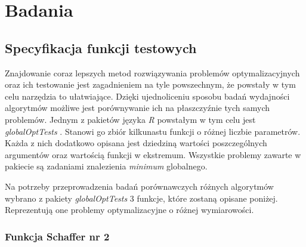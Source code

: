\newpage
\chapter{Badania}


\section{Specyfikacja funkcji testowych}
Znajdowanie coraz lepszych metod rozwiązywania problemów optymalizacyjnych oraz ich testowanie jest zagadnieniem na tyle powszechnym, że powstały w tym celu narzędzia to ułatwiające. Dzięki ujednoliceniu sposobu badań wydajności algorytmów możliwe jest porównywanie ich na płaszczyźnie tych samych problemów. Jednym z pakietów języka \emph{R} powstałym w tym celu jest \emph{globalOptTests} \cite{globalOptTestsPackage}. Stanowi go zbiór kilkunastu funkcji o różnej liczbie parametrów. Każda z nich dodatkowo opisana jest dziedziną wartości poszczególnych argumentów oraz wartością funkcji w ekstremum. Wszystkie problemy zawarte w pakiecie są zadaniami znalezienia \emph{minimum} globalnego.
\par
Na potrzeby przeprowadzenia badań porównawczych różnych algorytmów wybrano z pakiety \emph{globalOptTests} 3 funkcje, które zostaną opisane poniżej. Reprezentują one problemy  optymalizacyjne o różnej wymiarowości. 
\subsection{Funkcja Schaffer nr 2}

